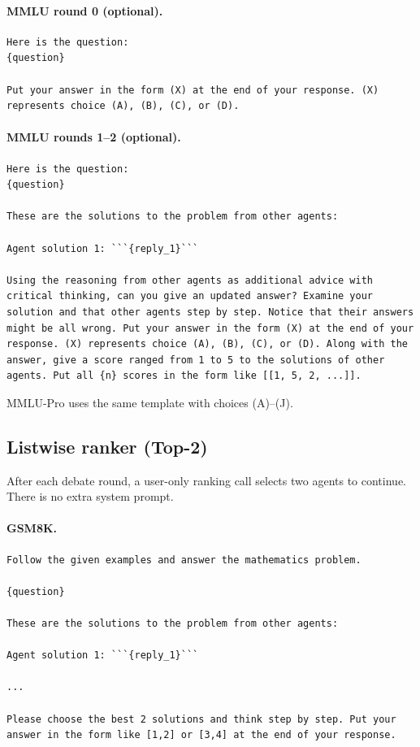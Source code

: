 \paragraph{MMLU round 0 (optional).}
\begin{lstlisting}[style=prompt]
Here is the question:
{question}

Put your answer in the form (X) at the end of your response. (X) represents choice (A), (B), (C), or (D).
\end{lstlisting}

\paragraph{MMLU rounds 1--2 (optional).}
\begin{lstlisting}[style=prompt]
Here is the question:
{question}

These are the solutions to the problem from other agents:

Agent solution 1: ```{reply_1}```

Using the reasoning from other agents as additional advice with critical thinking, can you give an updated answer? Examine your solution and that other agents step by step. Notice that their answers might be all wrong. Put your answer in the form (X) at the end of your response. (X) represents choice (A), (B), (C), or (D). Along with the answer, give a score ranged from 1 to 5 to the solutions of other agents. Put all {n} scores in the form like [[1, 5, 2, ...]].
\end{lstlisting}

MMLU-Pro uses the same template with choices (A)--(J).

\subsection{Listwise ranker (Top-2)}

After each debate round, a user-only ranking call selects two agents to continue.
There is no extra system prompt.

\paragraph{GSM8K.}
\begin{lstlisting}[style=prompt]
Follow the given examples and answer the mathematics problem.

{question}

These are the solutions to the problem from other agents:

Agent solution 1: ```{reply_1}```

...

Please choose the best 2 solutions and think step by step. Put your answer in the form like [1,2] or [3,4] at the end of your response.
\end{lstlisting}

